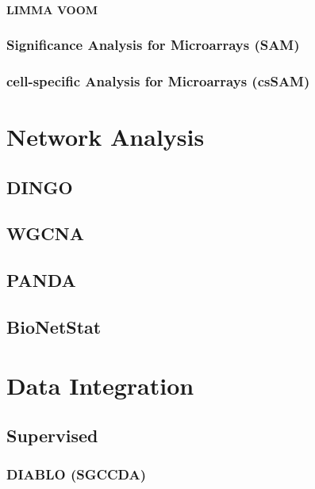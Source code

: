 \documentclass[]{book}
\begin{document}
\subsubsection{LIMMA VOOM}\label{limma-voom}

\subsection{Significance Analysis for Microarrays
(SAM)}\label{significance-analysis-for-microarrays-sam}

\subsection{cell-specific Analysis for Microarrays
(csSAM)}\label{cell-specific-analysis-for-microarrays-cssam}

\chapter{Network Analysis}\label{network-analysis}

\section{DINGO}\label{dingo}

\section{WGCNA}\label{wgcna}

\section{PANDA}\label{panda}

\section{BioNetStat}\label{bionetstat}

\chapter{Data Integration}\label{data-integration}

\section{Supervised}\label{supervised}

\subsection{DIABLO (SGCCDA)}\label{diablo-sgccda}
\end{document}
